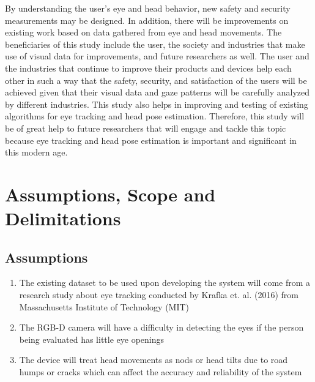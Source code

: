 By understanding the user’s eye and head behavior, new safety and security measurements may be designed. In addition, there will be improvements on existing work based on data gathered from eye and head movements. The beneficiaries of this study include the user, the society and industries that make use of visual data for improvements, and future researchers as well. The user and the industries that continue to improve their products and devices help each other in such a way that the safety, security, and satisfaction of the users will be achieved given that their visual data and gaze patterns will be carefully analyzed by different industries. This study also helps in improving and testing of existing algorithms for eye tracking and head pose estimation. Therefore, this study will be of great help to future researchers that will engage and tackle this topic because eye tracking and head pose estimation is important and significant in this modern age. 




\section{Assumptions, Scope and Delimitations}


\subsection{Assumptions}
\begin{enumerate}
	
	\item The existing dataset to be used upon developing the system will come from a research study about eye tracking conducted by Krafka et. al. (2016) from Massachusetts Institute of Technology (MIT) 
	
	\item The RGB-D camera will have a difficulty in detecting the eyes if the person being evaluated has little eye openings 
	
	\item The device will treat head movements as nods or head tilts due to road humps or cracks which can affect the accuracy and reliability of the system
	

	
\end{enumerate}

